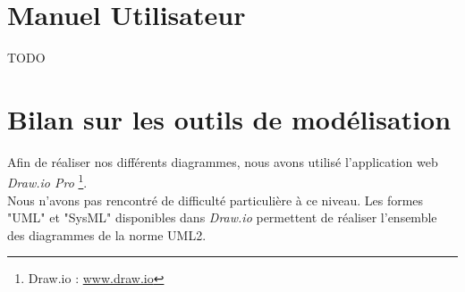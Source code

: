 \documentclass[12pt]{report}
\begin{document}
\section{Manuel Utilisateur}
TODO

\section{Bilan sur les outils de modélisation}
Afin de réaliser nos différents diagrammes, nous avons utilisé l'application web \textit{Draw.io Pro} \footnote{Draw.io : \url{www.draw.io}}.\\
Nous n'avons pas rencontré de difficulté particulière à ce niveau. Les formes "UML" et "SysML" disponibles dans \textit{Draw.io} permettent de réaliser l'ensemble des diagrammes de la norme UML2.
\end{document}
